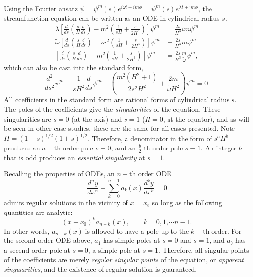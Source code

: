 Using the Fourier ansatz $\psi = \psi^m(s) e^{i \widetilde{\omega} t + im\phi} = \psi^m(s) e^{\lambda t + im \phi}$, the streamfunction equation can be written as an ODE in cylindrical radius $s$,
\begin{equation}\label{eqn:ode-hydro}
\begin{aligned}
    \lambda \left[\frac{d}{d s}\left(\frac{s}{H}\frac{d}{d s}\right) - m^2 \left(\frac{1}{sH} + \frac{s}{2H^3}\right)\right] \psi^m &= \frac{2 s}{H^{3}} im \psi^m \\ 
    \widetilde{\omega} \left[\frac{d}{d s}\left(\frac{s}{H}\frac{d}{d s}\right) - m^2 \left(\frac{1}{sH} + \frac{s}{2H^3}\right)\right] \psi^m &= \frac{2 s}{H^{3}} m \psi^m \\
    \left[\frac{d}{d s}\left(\frac{s}{H}\frac{d}{d s}\right) - m^2 \left(\frac{1}{sH} + \frac{s}{2H^3}\right)\right] \psi^m &= \frac{2 s}{H^{3}} \frac{m}{\widetilde{\omega}} \psi^m,
\end{aligned}
\end{equation}
which can also be cast into the standard form,
\begin{equation}
    \frac{d^{2}}{d s^{2}} \psi^{m} + \frac{1}{s H^{2}}\frac{d}{d s} \psi^{m} - \left(\frac{m^{2} \left(H^{2} + 1\right)}{2 s^{2} H^{2}} + \frac{2 m}{\widetilde{\omega} H^{2}}\right) \psi^{m} = 0.
\end{equation}
All coefficients in the standard form are rational forms of cylindrical radius $s$. The poles of the coefficients give the \textit{singularities} of the equation. These singularities are $s=0$ (at the axis) and $s=1$ ($H=0$, at the equator), and as will be seen in other case studies, these are the same for all cases presented.
Note $H = (1 - s)^{1/2} (1 + s)^{1/2}$. Therefore, a denominator in the form of $s^a H^b$ produces an $a-$th order pole $s=0$, and an $\frac{b}{2}$-th order pole $s=1$. An integer $b$ that is odd produces an \textit{essential singularity} at $s=1$.

Recalling the properties of ODEs, an $n-$th order ODE
\[
    \frac{d^n y}{dx^n} + \sum_{k=0}^{n-1} a_k(x) \frac{d^k y}{dx^k} = 0
\]
admits regular solutions in the vicinity of $x=x_0$ so long as the following quantities are analytic:
\[
    (x - x_0)^k a_{n-k}(x),\qquad k = 0, 1, \cdots n-1.
\]
In other words, $a_{n-k}(x)$ is allowed to have a pole up to the $k-$th order. For the second-order ODE above, $a_1$ has simple poles at $s=0$ and $s=1$, and $a_0$ has a second-order pole at $s=0$, a simple pole at $s=1$. Therefore, all singular points of the coefficients are merely \textit{regular singular points} of the equation, or \textit{apparent singularities}, and the existence of regular solution is guaranteed.

